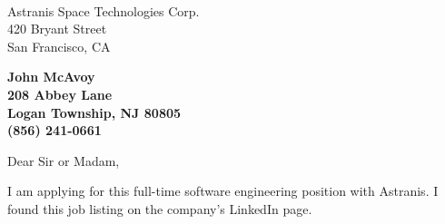 \documentclass[11pt]{letter} %
\begin{document}

\begin{letter}{\\
Astranis Space Technologies Corp.\\
420 Bryant Street\\
San Francisco, CA}


\begin{center}
\large\bf John McAvoy \\ %
208 Abbey Lane \\ Logan Township, NJ 80805 \\ (856) 241-0661 %
\end{center}
\vfill

\signature{John McAvoy} %


\opening{Dear Sir or Madam,}
\newcommand{\company}{Astranis}


I am applying for this full-time software engineering position with Astranis. I
found this job listing on the company's LinkedIn page.


\end{letter}
\end{document}

